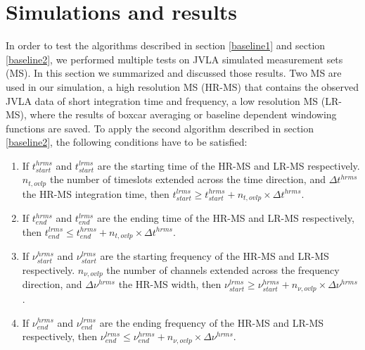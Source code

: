 \documentclass[useAMS,usenatbib]{mn2e}
\begin{document}
\section{Simulations and results}
In order to test the algorithms described in section \ref{baseline1} and section \ref{baseline2}, we performed  multiple tests on JVLA 
simulated measurement sets (MS). In 
this section we summarized and discussed those results. Two MS are used in 
our simulation, a high resolution MS (HR-MS) that contains the observed JVLA data of short integration time and frequency, a low 
resolution 
MS (LR-MS), where the results of boxcar averaging or baseline dependent windowing functions are saved. To apply the second algorithm 
described in section \ref{baseline2}, the following conditions have to be satisfied:
\begin{enumerate}
 \item If $t^{hrms}_{start}$ and $t^{lrms}_{start}$ are the starting time of the HR-MS and LR-MS respectively. $n_{t,ovlp}$ the number 
of timeslots extended across the time direction, and  $\Delta t^{hrms}$ the HR-MS integration time, then 
	    $t^{lrms}_{start}\geq t^{hrms}_{start} + n_{t,ovlp}\times \Delta t^{hrms}$. 
  \item If $t^{hrms}_{end}$ and $t^{lrms}_{end}$ are the ending time of the HR-MS and LR-MS respectively, then 
	    $t^{lrms}_{end}\leq t^{hrms}_{end} + n_{t,ovlp}\times \Delta t^{hrms}$. 
 \item If $\nu^{hrms}_{start}$ and $\nu^{lrms}_{start}$ are the starting frequency of the HR-MS and LR-MS respectively. $n_{\nu,ovlp}$ 
the number of channels extended across the frequency direction, and  $\Delta \nu^{hrms}$ the HR-MS width, then 
	    $\nu^{lrms}_{start} \geq \nu^{hrms}_{start} + n_{\nu,ovlp}\times \Delta \nu^{hrms}$. 
 \item If $\nu^{hrms}_{end}$ and $\nu^{lrms}_{end}$ are the ending frequency of the HR-MS and LR-MS respectively, then 
	    $\nu^{lrms}_{end} \leq \nu^{hrms}_{end} + n_{\nu,ovlp}\times \Delta \nu^{hrms}$. 
\end{enumerate}
\end{document}
